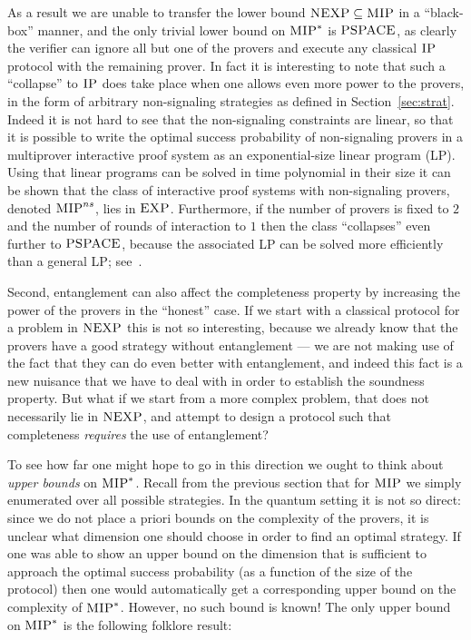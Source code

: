 As a result we are unable to transfer the lower bound $\textsc{NEXP} \subseteq \textsc{MIP}$ in a ``black-box'' manner, and the only trivial lower bound on $\textsc{MIP}^*$ is $\textsc{PSPACE}$, as clearly the verifier can ignore all but one of the provers and execute any classical $\textsc{IP}$ protocol with the remaining prover. In fact it is interesting to note that such a ``collapse'' to $\textsc{IP}$ does take place when one allows even more power to the provers, in the form of arbitrary non-signaling strategies as defined in Section~\ref{sec:strat}. Indeed it is not hard to see that the non-signaling constraints are linear, so that it is possible to write the optimal success probability of non-signaling provers in a multiprover interactive proof system as an exponential-size linear program (LP). Using that linear programs can be solved in time polynomial in their size it can be shown that the class of interactive proof systems with non-signaling provers, denoted $\textsc{MIP}^{ns}$, lies in $\textsc{EXP}$. Furthermore, if the number of provers is fixed to $2$ and the number of rounds of interaction to $1$ then the class ``collapses'' even further to $\textsc{PSPACE}$, because the associated LP can be solved more efficiently than a general LP; see~\cite{ito2010polynomial}. 

Second, entanglement can also affect the completeness property by increasing the power of the provers in the ``honest'' case. If we start with a classical protocol for a problem in $\textsc{NEXP}$ this is not so interesting, because we already know that the provers have a good strategy without entanglement --- we are not making use of the fact that they can do even better with entanglement, and indeed this fact is a new nuisance that we have to deal with in order to establish the soundness property. But what if we start from a more complex problem, that does not necessarily lie in $\textsc{NEXP}$, and attempt to design a protocol such that completeness 
\emph{requires} the use of entanglement? 

To see how far one might hope to go in this direction we ought to think about \emph{upper bounds} on $\textsc{MIP}^*$. Recall from the previous section that for $\textsc{MIP}$ we simply enumerated over all possible strategies. In the quantum setting it is not so direct: since we do not place a priori bounds on the complexity of the provers, it is unclear what dimension one should choose in order to find an optimal strategy. If one was able to show an upper bound on the dimension that is sufficient to approach the optimal success probability (as a function of the size of the protocol) then one would automatically get a corresponding upper bound on the complexity of $\textsc{MIP}^*$. However, no such bound is known! The only upper bound on $\textsc{MIP}^*$ is the following folklore result: 

